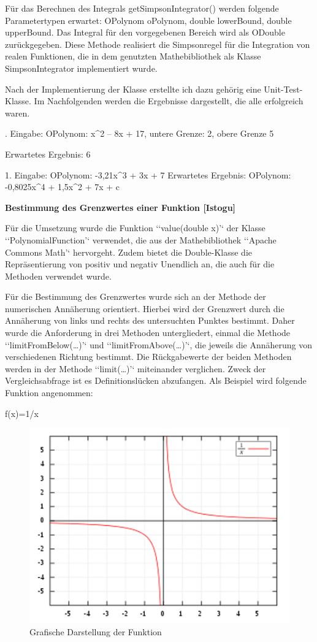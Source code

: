 Für das Berechnen des Integrals getSimpsonIntegrator() werden folgende Parametertypen erwartet: OPolynom oPolynom, double lowerBound, double upperBound. Das Integral für den vorgegebenen Bereich wird als ODouble zurückgegeben. Diese Methode realisiert die Simpsonregel für die Integration von realen Funktionen, die in dem genutzten Mathebibliothek als Klasse SimpsonIntegrator implementiert wurde. 

Nach der Implementierung der Klasse erstellte ich dazu gehörig eine Unit-Test-Klasse. Im Nachfolgenden werden die Ergebnisse dargestellt, die alle erfolgreich waren. 

.	Eingabe: OPolynom: x\^{}2 – 8x + 17, untere Grenze: 2, obere Grenze 5

\quad Erwartetes Ergebnis: 6

1.	Eingabe: OPolynom: -3,21x\^{}3 + 3x + 7
Erwartetes Ergebnis: OPolynom: -0,8025x\^{}4 + 1,5x\^{}2 + 7x + c

\textbf{Bestimmung des Grenzwertes einer Funktion [Istogu]}

Für die Umsetzung wurde die Funktion ‘‘value(double x)’‘ der Klasse ‘‘PolynomialFunction’‘ verwendet, die aus der Mathebibliothek ‘‘Apache Commons Math’‘ hervorgeht. Zudem bietet die Double-Klasse die Repräsentierung von positiv und negativ Unendlich an, die auch für die Methoden verwendet wurde.

Für die Bestimmung des Grenzwertes wurde sich an der Methode der numerischen Annäherung orientiert. Hierbei wird der Grenzwert durch die Annäherung von links und rechts des untersuchten Punktes bestimmt. Daher wurde die Anforderung in drei Methoden untergliedert, einmal die Methode ‘‘limitFromBelow(…)’‘ und ‘‘limitFromAbove(…)’‘, die jeweils die Annäherung von verschiedenen Richtung bestimmt. Die Rückgabewerte der beiden Methoden werden in der Methode ‘‘limit(…)’‘ miteinander verglichen. Zweck der Vergleichsabfrage ist es Definitionslücken abzufangen. Als Beispiel wird folgende Funktion angenommen:

f(x)=1/x

\begin{figure}[!h]
	\includegraphics[scale=1]{img/funktion-grafik}
	\caption[Grafische Darstellung der Funktion]{Grafische Darstellung der Funktion\footnotemark}
\end{figure}

